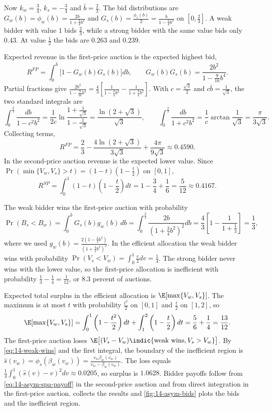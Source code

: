 Now $k_w=\frac{3}{4}$, $k_s=-\frac{3}{4}$ and $\bar b=\frac{2}{3}$. The bid distributions are
$G_w(b)=\phi_w(b)=\frac{2b}{1+\frac{3}{4}b^2}$ and $G_s(b)=\frac{\phi_s(b)}{2}=\frac{b}{1-\frac{3}{4}b^2}$
on $[0,\frac{2}{3}]$. A weak bidder with value $1$ bids $\frac{2}{3}$, while a strong bidder with
the same value bids only $0.43$. At value $\frac{1}{2}$ the bids are $0.263$ and $0.239$.

Expected revenue in the first-price auction is the expected highest bid,
\[
R^{FP}=\int_0^{\bar b}\bigl[1-G_w(b)G_s(b)\bigr]db,\qquad G_w(b)G_s(b)=\frac{2b^2}{1-\frac{9}{16}b^4}.
\]
Partial fractions give
$\frac{2b^2}{1-\frac{9}{16}b^4}=\frac{4}{3}\left[\frac{1}{1-\frac{3}{4}b^2}-\frac{1}{1+\frac{3}{4}b^2}\right]$.
With $c=\frac{\sqrt 3}{2}$ and $c\bar b=\frac{1}{\sqrt 3}$, the two standard integrals are
\[
\int_0^{\frac{2}{3}}\frac{db}{1-c^2b^2}=\frac{1}{2c}\ln\frac{1+\frac{1}{\sqrt 3}}{1-\frac{1}{\sqrt 3}}=\frac{\ln(2+\sqrt 3)}{\sqrt 3},
\qquad
\int_0^{\frac{2}{3}}\frac{db}{1+c^2b^2}=\frac{1}{c}\arctan\frac{1}{\sqrt 3}=\frac{\pi}{3\sqrt 3}.
\]
Collecting terms,
\begin{equation}\label{eq:14-unif-revenue}
R^{FP}=\frac{2}{3}-\frac{4\ln(2+\sqrt 3)}{3\sqrt 3}+\frac{4\pi}{9\sqrt 3}\approx 0.4590 .
\end{equation}
In the second-price auction revenue is the expected lower value. Since $\Pr(\min\{V_w,V_s\}>t)=(1-t)\left(1-\frac{t}{2}\right)$
on $[0,1]$,
\[
R^{SP}=\int_0^1(1-t)\left(1-\frac{t}{2}\right)dt=1-\frac{3}{4}+\frac{1}{6}=\frac{5}{12}\approx 0.4167 .
\]

The weak bidder wins the first-price auction with probability
\[
\Pr(B_s<B_w)=\int_0^{\bar b}G_s(b)g_w(b)\,db=\int_0^{\frac{2}{3}}\frac{2b}{\left(1+\frac{3}{4}b^2\right)^2}db
=\frac{4}{3}\left[1-\frac{1}{1+\frac{1}{3}}\right]=\frac{1}{3},
\]
where we used $g_w(b)=\frac{2(1-\frac{3}{4}b^2)}{(1+\frac{3}{4}b^2)^2}$. In the efficient allocation
the weak bidder wins with probability $\Pr(V_s<V_w)=\int_0^1\frac{v}{2}dv=\frac{1}{4}$. The strong
bidder never wins with the lower value, so the first-price allocation is inefficient with probability
$\frac{1}{3}-\frac{1}{4}=\frac{1}{12}$, or 8.3 percent of auctions.

Expected total surplus in the efficient allocation is $\E[\max\{V_w,V_s\}]$. The maximum is at most
$t$ with probability $\frac{t^2}{2}$ on $[0,1]$ and $\frac{t}{2}$ on $[1,2]$, so
\[
\E[\max\{V_w,V_s\}]=\int_0^1\left(1-\frac{t^2}{2}\right)dt+\int_1^2\left(1-\frac{t}{2}\right)dt=\frac{5}{6}+\frac{1}{4}=\frac{13}{12}.
\]
The first-price auction loses $\E\bigl[(V_s-V_w)\indic\{\text{weak wins},V_s>V_w\}\bigr]$. By
\eqref{eq:14-weak-wins} and the first integral, the boundary of the inefficient region is
$\hat s(v_w)=\phi_s(\beta_w(v_w))=\frac{v_w\beta_w(v_w)}{v_w-\beta_w(v_w)}$. The loss equals
$\frac{1}{4}\int_0^1(\hat s(v)-v)^2dv\approx 0.0205$, so surplus is $1.0628$. Bidder payoffs follow
from \eqref{eq:14-asym-spa-payoff} in the second-price auction and from direct integration in the
first-price auction.  collects the results and \cref{fig:14-asym-bids}
plots the bids and the inefficient region.

